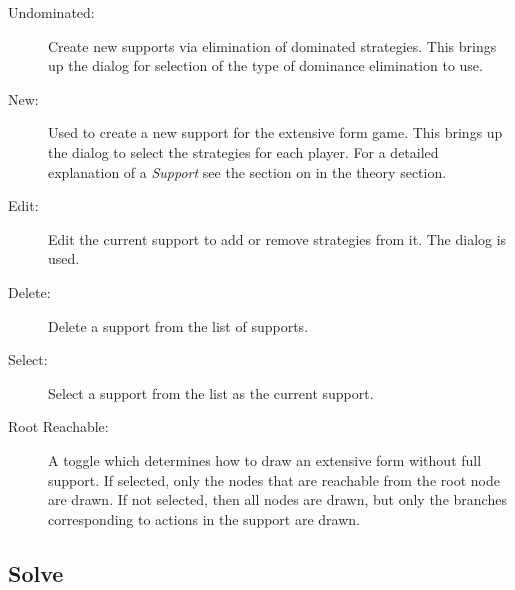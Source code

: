 \begin{description}
\item[Undominated:] Create new supports via elimination of dominated
strategies.  This brings up the  dialog for selection of the type of
dominance elimination to use.
\item[New:] Used to create a new support for the extensive form game.
This brings up the  dialog to select
the strategies for each player.  For a detailed explanation of a {\em
Support} see the section on  in the
theory section.
\item[Edit:] Edit the current support to add or remove strategies from
it. The  dialog is used.  
\item[Delete:] Delete a support from the list of supports.   
\item[Select:] Select a support from the list as the current support.  
\item[Root Reachable:] A toggle which determines how to draw an
extensive form without full support. If selected, only the nodes that
are reachable from the root node are drawn.  If not selected, then all
nodes are drawn, but only the branches corresponding to actions in the
support are drawn.
\end{description}

\subsection{Solve}\label{efsolve}

